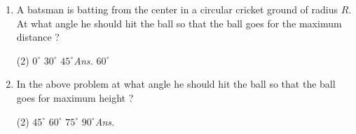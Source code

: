 \documentclass{article}
\newcommand{\ans}{\textcolor{red!95}{\textit{\quad Ans.}}}
\begin{document}
\begin{enumerate}
\item A batsman is batting from the center in  a circular cricket ground of radius $R$. At what angle he should hit the ball so that the ball goes for the maximum distance ?
\begin{tasks}(2)
	\task $0^\circ$
	\task $30^\circ$
	\task $45^\circ$\ans
	\task $60^\circ$
\end{tasks} 

\item In the above problem at what angle he should hit the ball so that the ball goes for maximum height ?
\begin{tasks}(2)
	\task $45^\circ$
	\task $60^\circ$
	\task $75^\circ$
	\task $90^\circ$\ans
\end{tasks}


\end{enumerate}
\end{document}
